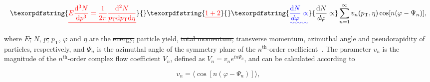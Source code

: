 \documentclass[ALICE,manyauthors]{cernphprep}
\providecommand{\DIFaddtex}[1]{{\protect\color{blue}\uwave{#1}}} %
\providecommand{\DIFdeltex}[1]{{\protect\color{red}\sout{#1}}}                      %
\providecommand{\DIFaddbegin}{} %
\providecommand{\DIFaddend}{} %
\providecommand{\DIFdelbegin}{} %
\providecommand{\DIFdelend}{} %
\providecommand{\DIFadd}[1]{\texorpdfstring{\DIFaddtex{#1}}{#1}} %
\providecommand{\DIFdel}[1]{\texorpdfstring{\DIFdeltex{#1}}{}} %
\begin{document}
\begin{equation}
\DIFdelbegin \DIFdel{E\frac{\mathrm{d}^3N}{\mathrm{d}p^3} = \frac{1}{2\pi}\frac{\mathrm{d}^2N}{p_{\mathrm{T}}\mathrm{d}p_{\mathrm{T}}\mathrm{d}\eta} }%
\DIFdel{1 + 2}\DIFdelend \DIFaddbegin \DIFadd{\frac{\mathrm{d}N}{d\varphi} \propto }\DIFaddend \sum_{n=1}^{\infty} v_n(p_{\mathrm{T}},\eta) \cos[n(\varphi - \Psi_n)]\DIFdelbegin %
\DIFdelend ,
\label{Eq:Fourier}
\end{equation}


\DIFaddbegin 

\DIFaddend \noindent where \DIFdelbegin \DIFdel{$E$, }\DIFdelend $N$, \DIFdelbegin \DIFdel{$p$, }\DIFdelend $p_{\mathrm{T}}$, $\varphi$ and $\eta$ are the \DIFdelbegin \DIFdel{energy, }\DIFdelend particle yield, \DIFdelbegin \DIFdel{total momentum, }\DIFdelend transverse momentum, azimuthal angle and pseudorapidity of particles, respectively, and $\Psi_n$ is the azimuthal angle of the symmetry plane of the $n^{\mathrm{th}}$-order coefficient~\cite{Bhalerao:2006tp,Alver:2008zza,Alver:2010gr,Alver:2010dn}. The parameter $v_{n}$ is the magnitude of the $n^{\mathrm{th}}$-order complex flow coefficient $V_n$, defined as $V_{n} = v_{n}e^{in\Psi_n}$, and can be calculated according to 

\DIFaddbegin 

\DIFaddend \begin{equation}
v_{n} = \langle{\cos[n(\varphi - \Psi_n)]}\rangle,
\label{Eq:vn}
\end{equation}
\end{document}
